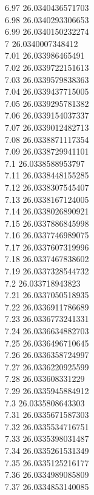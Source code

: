 {6.97	26.0340436571703\\
6.98	26.0340293306653\\
6.99	26.0340150232274\\
7	26.0340007348412\\
7.01	26.033986465491\\
7.02	26.0339722151613\\
7.03	26.0339579838363\\
7.04	26.0339437715005\\
7.05	26.0339295781382\\
7.06	26.0339154037337\\
7.07	26.0339012482713\\
7.08	26.0338871117354\\
7.09	26.0338729941101\\
7.1	26.0338588953797\\
7.11	26.0338448155285\\
7.12	26.0338307545407\\
7.13	26.0338167124005\\
7.14	26.0338026890921\\
7.15	26.0337886845998\\
7.16	26.0337746989075\\
7.17	26.0337607319996\\
7.18	26.0337467838602\\
7.19	26.0337328544732\\
7.2	26.033718943823\\
7.21	26.0337050518935\\
7.22	26.0336911786689\\
7.23	26.0336773241331\\
7.24	26.0336634882703\\
7.25	26.0336496710645\\
7.26	26.0336358724997\\
7.27	26.0336220925599\\
7.28	26.033608331229\\
7.29	26.0335945884912\\
7.3	26.0335808643303\\
7.31	26.0335671587303\\
7.32	26.0335534716751\\
7.33	26.0335398031487\\
7.34	26.0335261531349\\
7.35	26.0335125216177\\
7.36	26.0334989085809\\
7.37	26.0334853140085\\
}
